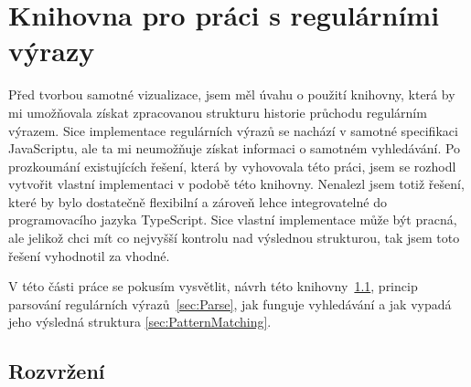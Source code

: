 \chapter{Knihovna pro práci s regulárními výrazy}\label{sec:Implementation1}

Před tvorbou samotné vizualizace, jsem měl úvahu o použití knihovny, 
která by mi umožňovala získat zpracovanou strukturu historie průchodu regulárním výrazem.
Sice implementace regulárních výrazů se nachází v samotné specifikaci JavaScriptu,
ale ta mi neumožňuje získat informaci o samotném vyhledávání.
Po prozkoumání existujících řešení, která by vyhovovala této práci, 
jsem se rozhodl vytvořit vlastní implementaci v podobě této knihovny.
Nenalezl jsem totiž řešení, které by bylo dostatečně flexibilní a 
zároveň lehce integrovatelné do programovacího jazyka TypeScript.
Sice vlastní implementace může být pracná, ale jelikož chci mít co nejvyšší kontrolu nad výslednou strukturou, 
tak jsem toto řešení vyhodnotil za vhodné. 

V této části práce se pokusím vysvětlit, návrh této knihovny~\ref{sec:Imp1LayoutReal}, 
princip parsování regulárních výrazů~\ref{sec:Parse}, jak funguje vyhledávání a jak vypadá jeho výsledná struktura \ref{sec:PatternMatching}.

\section{Rozvržení}\label{sec:Imp1LayoutReal}

